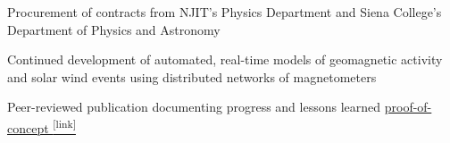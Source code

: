  \par
\vspace{-0.8em}
\begin{itemize*}
  \item Procurement of contracts from NJIT's Physics Department and Siena
    College's Department of Physics and Astronomy 
  \item Continued development of automated, real-time models of geomagnetic 
    activity and solar wind events using distributed networks of magnetometers
  \item Peer-reviewed publication documenting progress and lessons learned
    \href{http://onlinelibrary.wiley.com/doi/10.1029/2011SW000688/full}
    {proof-of-concept \textsuperscript{\tiny{[link]}}}
\end{itemize*}   

